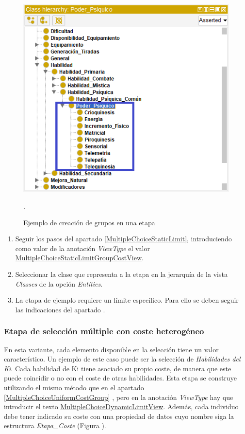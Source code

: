 \begin{figure}[H]
    \centering
    \includegraphics[scale=0.6]{Figures/Protege/Groups.png}
    \caption{Ejemplo de creación de grupos en una etapa}.
    \label{Groups}
\end{figure}

\begin{enumerate}
    \item Seguir los pasos del apartado \ref*{MultipleChoiceStaticLimit}, introduciendo como valor de la anotación \textit{ViewType}
    el valor \underline{MultipleChoiceStaticLimitGroupCostView}.
    \item Seleccionar la clase que representa a la etapa en la jerarquía de la vista \textit{Classes} de la opción \textit{Entities}.
    \item La etapa de ejemplo requiere un límite específico. Para ello se deben seguir las indicaciones del 
    apartado .
\end{enumerate}

\subsubsection{Etapa de selección múltiple con coste heterogéneo}
En esta variante, cada elemento disponible en la selección tiene un valor característico. Un ejemplo de este caso puede ser la 
selección de \textit{Habilidades del Ki}. Cada habilidad de Ki tiene asociado su propio coste, de manera que este puede coincidir 
o no con el coste de otras habilidades. Esta etapa se construye utilizando el mismo método que en el apartado \ref*{MultipleChoiceUniformCostGroup}
, pero en la anotación \textit{ViewType} hay que introducir el texto \underline{MultipleChoiceDynamicLimitView}. Además, cada individuo 
debe tener indicado su coste con una propiedad de datos cuyo nombre siga la estructura \textit{Etapa\_Coste} (Figura ).

